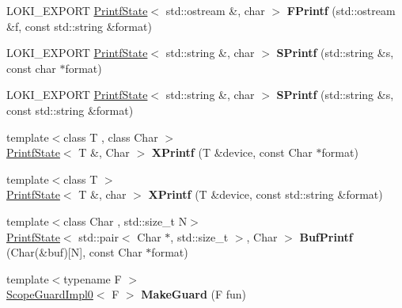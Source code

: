 \begin{DoxyCompactItemize}
\item 
\hypertarget{namespaceLoki_afff85c76fb9af6e7a54af78303ee19ec}{}L\+O\+K\+I\+\_\+\+E\+X\+P\+O\+R\+T \hyperlink{structLoki_1_1PrintfState}{Printf\+State}$<$ std\+::ostream \&, char $>$ {\bfseries F\+Printf} (std\+::ostream \&f, const std\+::string \&format)\label{namespaceLoki_afff85c76fb9af6e7a54af78303ee19ec}

\item 
\hypertarget{namespaceLoki_ae21fe8919f015ecb277eeeaeb4dcc03e}{}L\+O\+K\+I\+\_\+\+E\+X\+P\+O\+R\+T \hyperlink{structLoki_1_1PrintfState}{Printf\+State}$<$ std\+::string \&, char $>$ {\bfseries S\+Printf} (std\+::string \&s, const char $\ast$format)\label{namespaceLoki_ae21fe8919f015ecb277eeeaeb4dcc03e}

\item 
\hypertarget{namespaceLoki_a6481f58b8bc1425261b7a62b33d511b7}{}L\+O\+K\+I\+\_\+\+E\+X\+P\+O\+R\+T \hyperlink{structLoki_1_1PrintfState}{Printf\+State}$<$ std\+::string \&, char $>$ {\bfseries S\+Printf} (std\+::string \&s, const std\+::string \&format)\label{namespaceLoki_a6481f58b8bc1425261b7a62b33d511b7}

\item 
\hypertarget{namespaceLoki_a9a37e12a6d1a7273cb7dd55aa2198f18}{}{\footnotesize template$<$class T , class Char $>$ }\\\hyperlink{structLoki_1_1PrintfState}{Printf\+State}$<$ T \&, Char $>$ {\bfseries X\+Printf} (T \&device, const Char $\ast$format)\label{namespaceLoki_a9a37e12a6d1a7273cb7dd55aa2198f18}

\item 
\hypertarget{namespaceLoki_af3473c1d03fe12c55b9232d8d0d03abb}{}{\footnotesize template$<$class T $>$ }\\\hyperlink{structLoki_1_1PrintfState}{Printf\+State}$<$ T \&, char $>$ {\bfseries X\+Printf} (T \&device, const std\+::string \&format)\label{namespaceLoki_af3473c1d03fe12c55b9232d8d0d03abb}

\item 
\hypertarget{namespaceLoki_a758f297ed4c70b00a6e56fee66bdc1cb}{}{\footnotesize template$<$class Char , std\+::size\+\_\+t N$>$ }\\\hyperlink{structLoki_1_1PrintfState}{Printf\+State}$<$ std\+::pair$<$ Char $\ast$, std\+::size\+\_\+t $>$, Char $>$ {\bfseries Buf\+Printf} (Char(\&buf)\mbox{[}N\mbox{]}, const Char $\ast$format)\label{namespaceLoki_a758f297ed4c70b00a6e56fee66bdc1cb}

\item 
\hypertarget{namespaceLoki_af99105baedce44e1dd7aaa22443f7d87}{}{\footnotesize template$<$typename F $>$ }\\\hyperlink{classLoki_1_1ScopeGuardImpl0}{Scope\+Guard\+Impl0}$<$ F $>$ {\bfseries Make\+Guard} (F fun)\label{namespaceLoki_af99105baedce44e1dd7aaa22443f7d87}


\end{DoxyCompactItemize}
